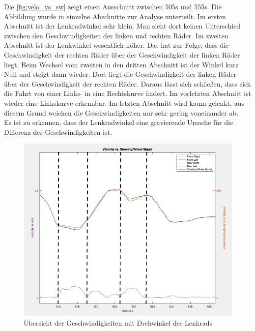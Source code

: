 	Die \autoref{fig:velo_vs_sw} zeigt einen Ausschnitt zwischen 505s und 555s. Die Abbildung wurde in einzelne Abschnitte zur Analyse unterteilt. Im ersten Abschnitt ist der Lenkradwinkel sehr klein. Man sieht dort keinen Unterschied zwischen den Geschwindigkeiten der linken und rechten Räder. Im zweiten Abschnitt ist der Lenkwinkel wesentlich höher. Das hat zur Folge, dass die Geschwindigkeit der rechten Räder über der Geschwindigkeit der linken Räder liegt. Beim Wechsel vom zweiten in den dritten Abschnitt ist der Winkel kurz Null und steigt dann wieder. Dort liegt die Geschwindigkeit der linken Räder über der Geschwindigkeit der rechten Räder. Daraus lässt sich schließen, dass sich die Fahrt von einer Links- in eine Rechtskurve ändert. Im vorletzten Abschnitt ist wieder eine Linkskurve erkennbar. Im letzten Abschnitt wird kaum gelenkt, aus diesem Grund weichen die Geschwindigkeiten nur sehr gering voneinander ab.\\
Es ist zu erkennen, dass der Lenkradwinkel eine gravierende Ursache für die Differenz der Geschwindigkeiten ist.
\begin{figure}[h!]
	\centering
	\includegraphics[width=1\linewidth]{../Graphiken/velo_vs_sw}
	\caption{Übersicht der Geschwindigkeiten mit Drehwinkel des Lenkrads}
	\label{fig:velo_vs_sw}
\end{figure}
